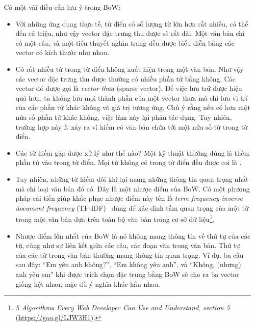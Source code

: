 Có một vài điều cần lưu ý trong BoW: 
\begin{itemize}
    \item Với những ứng dụng thực tế, {từ điển} có số lượng từ lớn hơn rất
    nhiều, có thể đến cả triệu, như vậy vector đặc trưng thu được sẽ rất dài.
    Một văn bản chỉ có một câu, và một tiểu thuyết nghìn trang đều được biểu
    diễn bằng các vector có kích thước như nhau.

    \item Có rất nhiều từ trong từ điển không xuất hiện trong một văn bản. Như
    vậy các vector đặc trưng thu được thường có nhiều phần tử bằng không.
    Các vector đó được gọi là \textit{vector thưa} (sparse vector). Để việc lưu trữ được hiệu quả hơn, ta không lưu mọi thành phần của một
    vector thưa mà chỉ lưu {vị trí} của các phần tử khác không và {giá
    trị} tương ứng. Chú ý rằng nếu có hơn một nửa số phần tử khác không, việc
    làm này lại phản tác dụng. Tuy nhiên, trường hợp này ít xảy ra vì hiếm có
    văn bản chứa tới một nửa số từ trong từ điển.

    \item Các từ hiếm gặp được xử lý như thế nào? Một kỹ thuật thường dùng là
    thêm phần tử  vào trong từ điển. Mọi từ không có
    trong từ điển đều được coi là
    .

    \item Tuy nhiên, những từ hiếm đôi khi lại mang những thông tin quan
    trọng nhất mà chỉ loại văn bản đó có. Đây là một nhược điểm của BoW. Có một
    phương pháp cải tiến giúp khắc phục nhược điểm này tên là \textit{term
    frequency-inverse document frequency} (TF-IDF)~\cite{salton1975vector} dùng
    để xác định tầm quan trọng của một từ trong một văn bản dựa trên toàn bộ văn
    bản trong cơ sở dữ liệu\footnote{\textit{5 Algorithms Every Web Developer
    Can Use and Understand, section 5} (\url{https://goo.gl/LJW3H1}).}.

    \item Nhược điểm lớn nhất của BoW là nó không mang thông tin về thứ tự của
    các từ, cũng như sự liên kết giữa các câu, các đoạn văn trong văn bản. Thứ
    tự của các từ trong văn bản thường mang thông tin quan trọng. Ví dụ, ba câu
    sau đây: ``Em yêu anh không?'', ``Em không yêu anh'', và ``Không, (nhưng)
    anh yêu em'' khi được trích chọn đặc trưng bằng BoW sẽ cho ra ba vector
    giống hệt nhau, mặc dù ý nghĩa khác hẳn nhau.
\end{itemize}
 

